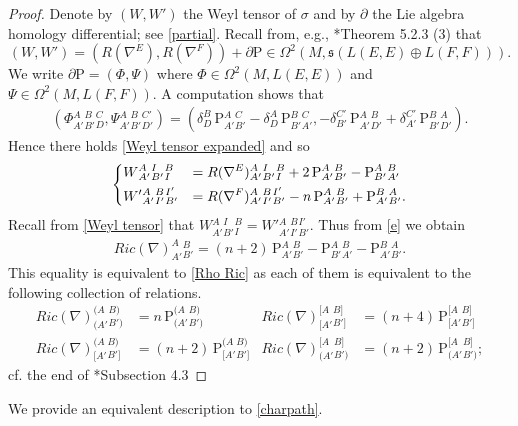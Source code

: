 \documentclass[11pt]{amsart}
\begin{document}
\begin{proof}
Denote by $(W,W')$ the Weyl tensor of $\sigma$ and by $\partial$ the Lie algebra homology differential; see \eqref{partial}. Recall from, e.g., \cite{Book}*{Theorem 5.2.3 (3)} that 
\[(W,W')=(R(\nabla^E),R(\nabla^F))+\partial\mathrm P\in\Omega^2(M,\mathfrak s(L(E,E)\oplus L(F,F))).\]
We write $\partial\mathrm P=(\Phi,\Psi)$ where $\Phi\in\Omega^2(M,L(E,E))$ and $\Psi\in\Omega^2(M,L(F,F))$.
A computation shows that 
\begin{align*}
(\Phi{}^{A}_{A'}{}^{B}_{B'}{}^{C}_{D},\Psi{}^{A}_{A'}{}^{B}_{B'}{}^{C'}_{D'})=(\delta^{B}_{D}\,\mathrm P{}^{A}_{A'}{}^{C}_{B'}-\delta^{A}_{D}\,\mathrm P{}^{B}_{B'}{}^{C}_{A'},-\delta^{C'}_{B'}\,\mathrm P{}^{A}_{A'}{}^{B}_{D'} +\delta^{C'}_{A'}\,\mathrm P{}^{B}_{B'}{}^{A}_{D'}).
\end{align*}
Hence there holds \eqref{Weyl tensor expanded} and so
\begin{equation}\label{e}
\begin{aligned}
\begin{dcases}
W{}^{A}_{A'}{}^{I}_{B'}{}^{B}_{I}
    &=R(\nabla^E)^{A}_{A'}{}^{I}_{B'}{}^{B}_{I}+2\,\mathrm P{}^A_{A'}{}^B_{B'}-\mathrm P{}^A_{B'}{}^B_{A'}\\
W'{}^{A}_{A'}{}^{B}_{I'}{}^{I'}_{B'}
    &=R(\nabla^F)^{A}_{A'}{}^{B}_{I'}{}^{I'}_{B'}-n\,\mathrm P{}^A_{A'}{}^B_{B'}+\mathrm P{}^B_{A'}{}^A_{B'}.
\end{dcases}
\end{aligned}
\end{equation}
Recall from \cref{Weyl tensor} that $W{}^{A}_{A'}{}^{I}_{B'}{}^{B}_{I}=W'{}^{A}_{A'}{}^{B}_{I'}{}^{I'}_{B'}$. Thus from \eqref{e} we obtain
\begin{align*}
Ric(\nabla)^A_{A'}{}^B_{B'}=(n+2)\,\mathrm P{}^A_{A'}{}^B_{B'}-\mathrm P{}^A_{B'}{}^B_{A'}-\mathrm P{}^B_{A'}{}^A_{B'}.
\end{align*}
This equality is equivalent to \eqref{Rho Ric} as each of them is equivalent to the following collection of relations.
\begin{align*}
Ric(\nabla)^{(A}_{(A'}{}^{B)}_{B')}&=n\,\mathrm P{}^{(A}_{(A'}{}^{B)}_{B')}&Ric(\nabla)^{[A}_{[A'}{}^{B]}_{B']}&=(n+4)\,\mathrm P{}^{[A}_{[A'}{}^{B]}_{B']}\\
            Ric(\nabla)^{(A}_{[A'}{}^{B)}_{B']}&=(n+2)\,\mathrm P{}^{(A}_{[A'}{}^{B)}_{B']}&Ric(\nabla)^{[A}_{(A'}{}^{B]}_{B')}&=(n+2)\,\mathrm P{}^{[A}_{(A'}{}^{B]}_{B')};        
\end{align*}
cf. the end of \cite{CM}*{Subsection 4.3}
\end{proof}
We provide an equivalent description to \cref{charpath}.  
\end{document}
